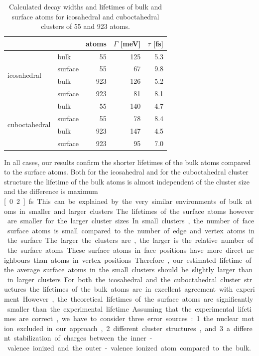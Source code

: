 \begin{table}[h]
 \centering
 \caption{Calculated decay widths and lifetimes of bulk and surface atoms
          for icosahedral and cuboctahedral clusters of 55 and 923 atoms.}
 \begin{tabular}{llrrr}
  \toprule
               &                            & atoms & $\Gamma$ [meV] & $\tau$ [fs]\\
  \midrule
   \multirow{4}{*}{icosahedral}   & bulk    &   55  &   125          & 5.3 \\
                                  & surface &   55  &    67          & 9.8 \\
                                  & bulk    &  923  &   126          & 5.2 \\
                                  & surface &  923  &    81          & 8.1 \\
  \midrule
   \multirow{4}{*}{cuboctahedral} & bulk    &   55  &   140          & 4.7 \\
                                  & surface &   55  &    78          & 8.4 \\
                                  & bulk    &  923  &   147          & 4.5 \\
                                  & surface &  923  &    95          & 7.0 \\
  \bottomrule
 \end{tabular}
 \label{table:lifetimes}
\end{table}

In all cases, our results confirm the shorter lifetimes of the bulk atoms compared
to the surface atoms. Both for the icosahedral and for the cuboctahedral cluster
structure the lifetime of the bulk atoms is almost independent of the cluster size
and the difference is maximum \unit[0.2]{fs}. This can be explained by the very
similar environments of bulk atoms in smaller and larger clusters.
The lifetimes of the surface atoms however are smaller for the larger cluster sizes.
In small clusters, the number of face surface atoms is small compared to the
number of edge and vertex atoms in the surface. The larger the clusters are,
the larger is the relative number of the surface atoms. These surface atoms
in face positions have more direct neighbours than atoms in vertex positions.
Therefore, our estimated lifetime of the average surface atoms in the small
clusters should be slightly larger than in larger clusters.

For both the icosahedral and the cuboctahedral cluster structures the lifetimes
of the bulk atoms are in excellent agreement with experiment.
However, the theoretical lifetimes of the surface atoms are significantly
smaller than the experimental lifetime. Assuming that the
experimental lifetimes are correct, we have to consider three error sources:
1. the nuclear motion excluded in our approach, 2. different cluster structures,
and 3. a different stabilization of charges between the
inner-valence ionized and the outer-valence ionized atom compared to the bulk.

